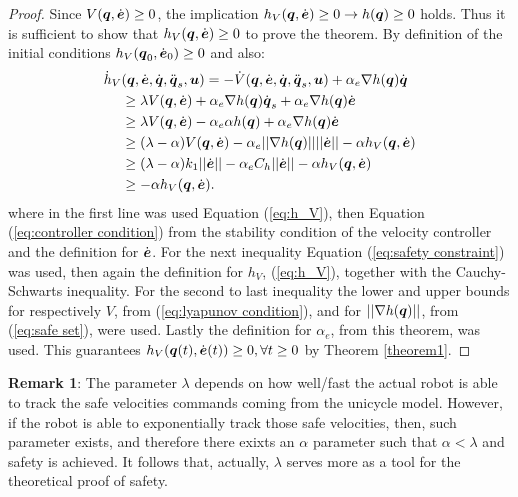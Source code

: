 \begin{proof}
    Since $V({\boldsymbol{q}},\dot{\boldsymbol{e}}) \geq 0$, the implication $h_V({\boldsymbol{q}},\dot{\boldsymbol{e}}) \geq 0 \rightarrow h({\boldsymbol{q}}) \geq 0$ holds. Thus it is sufficient to show that $h_V({\boldsymbol{q}},\dot{\boldsymbol{e}}) \geq 0$ to prove the theorem. By definition of the initial conditions $h_V({\boldsymbol{q}}_0,\dot{\boldsymbol{e}}_0) \geq 0$ and also:
    \begin{equation*}
        \begin{split}
            \dot{h}_V&({\boldsymbol{q}},\dot{\boldsymbol{e}},\dot{{\boldsymbol{q}}},\ddot{{\boldsymbol{q}}}_s,\boldsymbol{u}) = -\dot{V}({\boldsymbol{q}},\dot{\boldsymbol{e}},\dot{{\boldsymbol{q}}},\ddot{{\boldsymbol{q}}}_s,\boldsymbol{u}) + \alpha_e \nabla h({\boldsymbol{q}})\dot{{\boldsymbol{q}}} \\
            & \geq \lambda V({\boldsymbol{q}},\dot{\boldsymbol{e}}) + \alpha_e \nabla h({\boldsymbol{q}})\dot{{\boldsymbol{q}}}_s + \alpha_e \nabla h({\boldsymbol{q}}) \dot{\boldsymbol{e}} \\
            & \geq \lambda V({\boldsymbol{q}},\dot{\boldsymbol{e}})  - \alpha_e \alpha h({\boldsymbol{q}}) + \alpha_e \nabla h({\boldsymbol{q}}) \dot{\boldsymbol{e}} \\
            & \geq (\lambda-\alpha) V({\boldsymbol{q}},\dot{\boldsymbol{e}}) - \alpha_e ||\nabla h({\boldsymbol{q}})|| ||\dot{\boldsymbol{e}}|| - \alpha h_V({\boldsymbol{q}},\dot{\boldsymbol{e}}) \\
            & \geq (\lambda-\alpha) k_1 ||\dot{\boldsymbol{e}}|| - \alpha_e C_h ||\dot{\boldsymbol{e}}|| - \alpha h_V({\boldsymbol{q}},\dot{\boldsymbol{e}}) \\
            & \geq - \alpha h_V({\boldsymbol{q}},\dot{\boldsymbol{e}}).
        \end{split}
    \end{equation*}
    where in the first line was used Equation (\ref{eq:h_V}), then Equation (\ref{eq:controller condition}) from the stability condition of the velocity controller and the definition for $\dot{\boldsymbol{e}}$. For the next inequality Equation (\ref{eq:safety constraint}) was used, then again the definition for $h_V$, (\ref{eq:h_V}), together with the Cauchy-Schwarts inequality. For the second to last inequality the lower and upper bounds for respectively $V$, from (\ref{eq:lyapunov condition}), and for $||\nabla h({\boldsymbol{q}})||$, from (\ref{eq:safe set}), were used. Lastly the definition for $\alpha_e$, from this theorem, was used. This guarantees $h_V({\boldsymbol{q}}(t),\dot{\boldsymbol{e}}(t)) \geq 0, \forall t \geq 0$ by Theorem \ref{theorem1}.
\end{proof}
\textbf{Remark 1}: The parameter $\lambda$ depends on how well/fast the actual robot is able to track the safe velocities commands coming from the unicycle model. However, if the robot is able to exponentially track those safe velocities, then, such parameter exists, and therefore there exixts an $\alpha$ parameter such that $\alpha <\lambda$ and safety is achieved. It follows that, actually, $\lambda$ serves more as a tool for the theoretical proof of safety.\\ 
